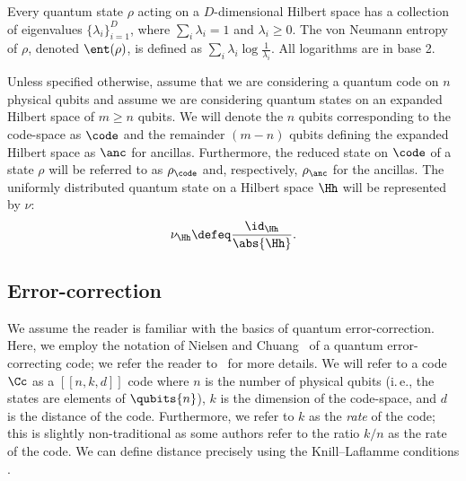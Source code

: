\documentclass[11pt]{article}
\newcommand{\ie}{i.\,e.}
\begin{document}
Every quantum state $\rho$ acting on a $D$-dimensional Hilbert space has a collection of eigenvalues $\{\lambda_i\}_{i=1}^D$, where $\sum_i\lambda_i=1$ and $\lambda_i\geq 0$. The von Neumann entropy of $\rho$, denoted $\ent(\rho)$, is defined as $\sum_i \lambda_i \log\frac{1}{\lambda_i}$. All logarithms are in base 2.

Unless specified otherwise, assume that we are considering a quantum code 
on $n$ physical qubits and assume we are considering quantum states on an expanded Hilbert space of $m \geq n$ qubits. We will denote the $n$ qubits corresponding to the code-space as $\code$ and the remainder $(m - n)$ qubits defining the expanded Hilbert space as $\anc$ for ancillas. Furthermore, the reduced
%
state on $\code$ of a state $\rho$ will be referred to as $\rho_\code$ and, respectively, $\rho_\anc$ for the ancillas. The uniformly distributed quantum state on a Hilbert space $\Hh$ will be represented by $\nu$:
\begin{align}
    \nu_\Hh \defeq \frac{\id_\Hh}{\abs{\Hh}}.
\end{align}


\subsection{Error-correction}  
%
We assume the reader is familiar with the basics of quantum error-correction. Here, we employ the notation of Nielsen and Chuang~\cite{Nielsen_Chuang_2010} of a quantum error-correcting code; we refer the reader to~\cite{Nielsen_Chuang_2010} for more details. We will refer to a code $\Cc$ as a $[[n,k,d]]$ code where $n$ is the number of physical qubits (\ie, the states are elements of $\qubits{n}$), $k$ is the dimension of the code-space, and $d$ is the distance of the code. Furthermore, we refer to $k$ as the \emph{rate} of the code; this is slightly non-traditional 
as some %
authors  %
refer to the ratio $k/n$ as the rate of the code. We can define distance precisely using the 
Knill--Laflamme conditions \cite{PhysRevA.55.900}.
%
%
\end{document}
